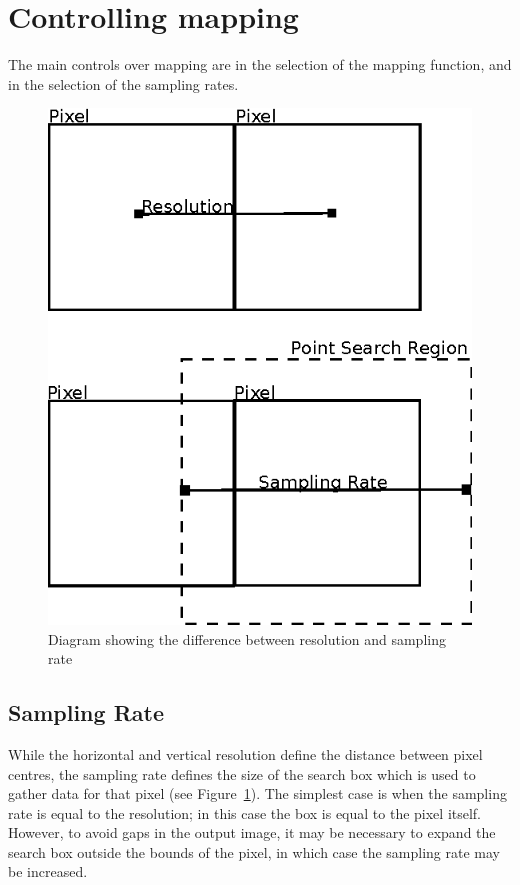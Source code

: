 \documentclass[a4paper,12pt]{article}
\begin{document}
\section{Controlling mapping}
The main controls over mapping are in the selection of the mapping function, and in the selection of the sampling rates.
\begin{figure}
\centering
\includegraphics{resolution_and_sampling.eps}
\caption{Diagram showing the difference between resolution and sampling rate}
\label{fig:res_and_sampling}
\end{figure}
\subsection{Sampling Rate}
While the horizontal and vertical resolution define the distance between pixel centres, the sampling rate defines the size of the search box which is used to gather data for that pixel (see Figure~\ref{fig:res_and_sampling}). The simplest case is when the sampling rate is equal to the resolution; in this case the box is equal to the pixel itself. However, to avoid gaps in the output image, it may be necessary to expand the search box outside the bounds of the pixel, in which case the sampling rate may be increased.
\end{document}
